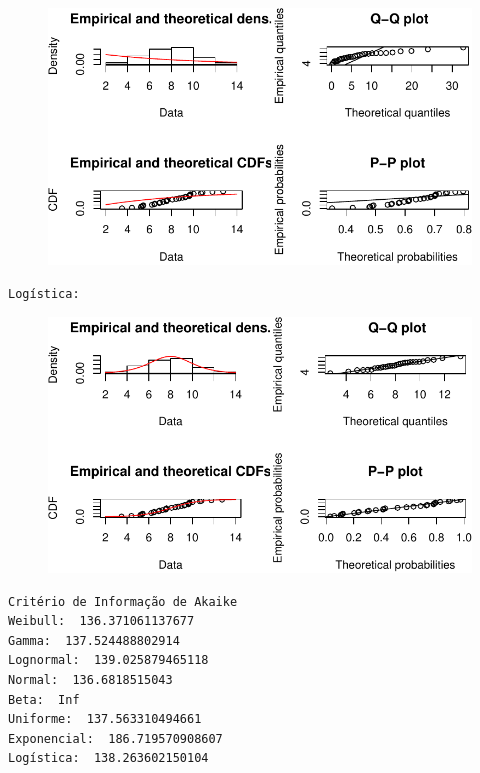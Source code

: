 \documentclass[
  letterpaper,
  DIV=11,
  numbers=noendperiod]{scrartcl}
\begin{document}
\begin{figure}[H]

{\centering \includegraphics{quiz5_files/figure-pdf/unnamed-chunk-37-8.pdf}

}

\end{figure}

\begin{verbatim}
Logística: 
\end{verbatim}

\begin{figure}[H]

{\centering \includegraphics{quiz5_files/figure-pdf/unnamed-chunk-37-9.pdf}

}

\end{figure}

\begin{verbatim}
Critério de Informação de Akaike
Weibull:  136.371061137677 
Gamma:  137.524488802914 
Lognormal:  139.025879465118 
Normal:  136.6818515043 
Beta:  Inf 
Uniforme:  137.563310494661 
Exponencial:  186.719570908607 
Logística:  138.263602150104 
\end{verbatim}
\end{document}
